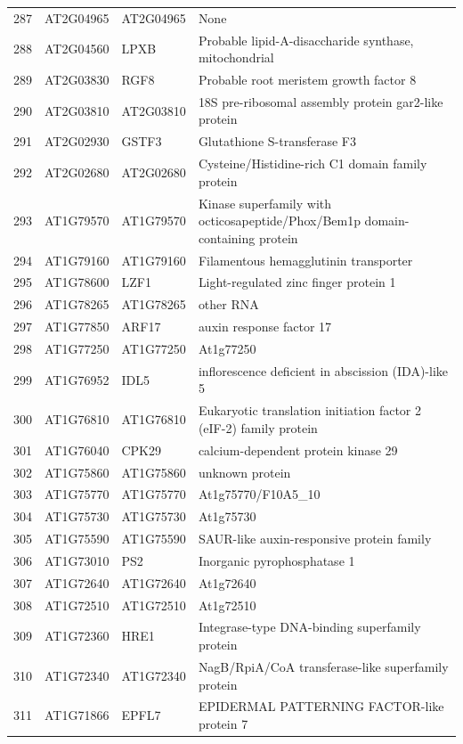 \documentclass[11pt]{article}
\begin{document}
\begin{center}
\begin{tabular}{rlll}
287 & AT2G04965 & AT2G04965 & None\\
288 & AT2G04560 & LPXB & Probable lipid-A-disaccharide synthase, mitochondrial\\
289 & AT2G03830 & RGF8 & Probable root meristem growth factor 8\\
290 & AT2G03810 & AT2G03810 & 18S pre-ribosomal assembly protein gar2-like protein\\
291 & AT2G02930 & GSTF3 & Glutathione S-transferase F3\\
292 & AT2G02680 & AT2G02680 & Cysteine/Histidine-rich C1 domain family protein\\
293 & AT1G79570 & AT1G79570 & Kinase superfamily with octicosapeptide/Phox/Bem1p domain-containing protein\\
294 & AT1G79160 & AT1G79160 & Filamentous hemagglutinin transporter\\
295 & AT1G78600 & LZF1 & Light-regulated zinc finger protein 1\\
296 & AT1G78265 & AT1G78265 & other RNA\\
297 & AT1G77850 & ARF17 & auxin response factor 17\\
298 & AT1G77250 & AT1G77250 & At1g77250\\
299 & AT1G76952 & IDL5 & inflorescence deficient in abscission (IDA)-like 5\\
300 & AT1G76810 & AT1G76810 & Eukaryotic translation initiation factor 2 (eIF-2) family protein\\
301 & AT1G76040 & CPK29 & calcium-dependent protein kinase 29\\
302 & AT1G75860 & AT1G75860 & unknown protein\\
303 & AT1G75770 & AT1G75770 & At1g75770/F10A5\_10\\
304 & AT1G75730 & AT1G75730 & At1g75730\\
305 & AT1G75590 & AT1G75590 & SAUR-like auxin-responsive protein family\\
306 & AT1G73010 & PS2 & Inorganic pyrophosphatase 1\\
307 & AT1G72640 & AT1G72640 & At1g72640\\
308 & AT1G72510 & AT1G72510 & At1g72510\\
309 & AT1G72360 & HRE1 & Integrase-type DNA-binding superfamily protein\\
310 & AT1G72340 & AT1G72340 & NagB/RpiA/CoA transferase-like superfamily protein\\
311 & AT1G71866 & EPFL7 & EPIDERMAL PATTERNING FACTOR-like protein 7\\

\end{tabular}
\end{center}
\end{document}
